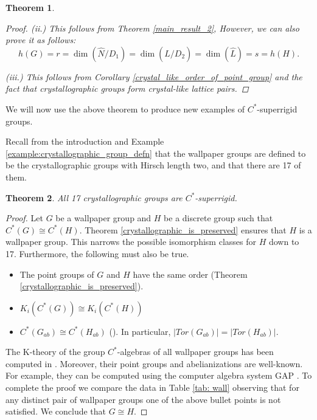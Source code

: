 \documentclass[11pt, twoside]{amsart}
\newtheorem{thm}{Theorem}[section]
\theoremstyle{definition}
\begin{document}
\begin{thm}
\begin{proof}
        {\em (ii.)} This follows from Theorem \ref{main_result_2}, However, we can also prove it as follows:
\[h(G)=r=\dim(\widehat{N}/D_1)=\dim(\widehat{L}/D_2)=\dim(\widehat{L})=s=h(H).\]

        
        {\em (iii.)} This follows from Corollary \ref{crystal_like_order_of_point_group} and the fact that crystallographic groups form crystal-like lattice pairs.
    \end{proof}
\end{thm}
We will now use the above theorem to produce new examples of $C^*$-superrigid groups.  \par
Recall from the introduction and Example \ref{example:crystallographic_group_defn} that the wallpaper groups are defined to be the crystallographic groups with Hirsch length two, and that there are 17 of them.

\begin{thm}\label{wallpaper_c*_superrigid}
    All 17 crystallographic groups are $C^*$-superrigid.
\end{thm}

\begin{proof}
    Let $G$ be a wallpaper group and $H$ be a discrete group such that $C^*(G)\cong C^*(H)$. Theorem \ref{crystallographic_is_preserved} ensures that $H$ is a wallpaper group. This narrows the possible isomorphism classes for $H$ down to 17. Furthermore, the following must also be true.
\begin{itemize}
    \item The point groups of $G$ and $H$ have the same order (Theorem \ref{crystallographic_is_preserved}).
    \item $K_i(C^*(G))\cong K_i(C^*(H))$
    \item $C^*(G_{ab})\cong C^*(H_{ab})$ (\cite[Cor. 1.3]{free_nilp_c*_superrigid}). In particular, $|Tor(G_{ab})|=|Tor(H_{ab})|$.
\end{itemize}
The K-theory of the group $C^*$-algebras of all wallpaper groups has been computed in \cite{yang1998crossed}. Moreover, their point groups and abelianizations are well-known. For example, they can be computed using the computer algebra system GAP \cite{GAP4}. To complete the proof we compare the data in Table \ref{tab: wall} observing that for any distinct pair of wallpaper groups one of the above bullet points is not satisfied. We conclude that $G\cong H$.
\end{proof}

   
\end{document}
